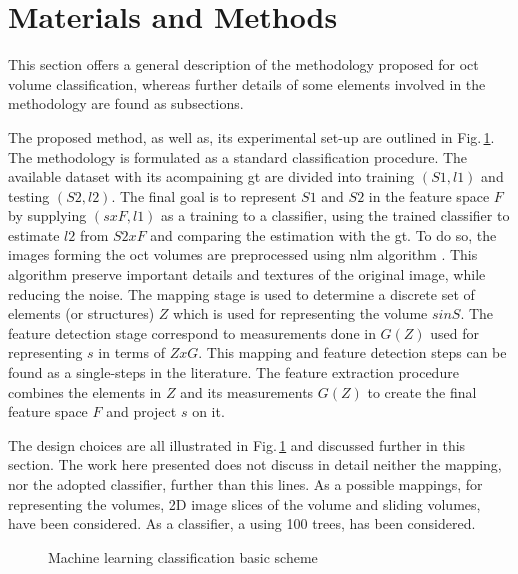 \graphicspath{ {./content/method/figures/}}

\section{Materials and Methods}

This section offers a general description of the methodology proposed for \ac{oct} volume classification, whereas further details of some elements involved in the methodology are found as subsections.

The proposed method, as well as, its experimental set-up are outlined in Fig.\,\ref{fig:ML-scheme}.
The methodology is formulated as a standard classification procedure.
The available dataset with its acompaining \ac{gt} are divided into training $(S1,l1)$ and testing $(S2,l2)$. 
The final goal is to represent $S1$ and $S2$ in the feature space $F$ by supplying $(sxF,l1)$ as a training to a classifier, using the trained classifier to estimate $l2$ from $S2xF$ and comparing the estimation with the \ac{gt}.
To do so, the images forming the \ac{oct} volumes are preprocessed using \ac{nlm} algorithm \cite{buades2005non}. This algorithm preserve important details and textures of the original image, while reducing the noise.
The mapping stage is used to determine a discrete set of elements (or structures) $Z$  which is used for representing the volume $s  in S$.
The feature detection stage correspond to measurements done in $G(Z)$ used for representing $s$ in terms of $ZxG$. 
This mapping and feature detection steps can be found as a single-steps in the literature.
The feature extraction procedure combines the elements in $Z$ and its measurements $G(Z)$ to create the final feature space $F$ and project $s$ on it.

The design choices are all illustrated in Fig.\,\ref{fig:ML-scheme} and discussed further in this section. The work here presented does not discuss in detail neither the mapping, nor the adopted classifier, further than this lines.
As a possible mappings, for representing the volumes, 2D image slices of the volume and \color{red}{7x7x7}\color{black} sliding volumes, have been considered. 
As a classifier, a \color{red}{Random Forest}\color{black} using 100 trees, has been considered.

\begin{figure}[h]
  \caption{Machine learning classification basic scheme}
  \label{fig:ML-scheme}
\end{figure}

